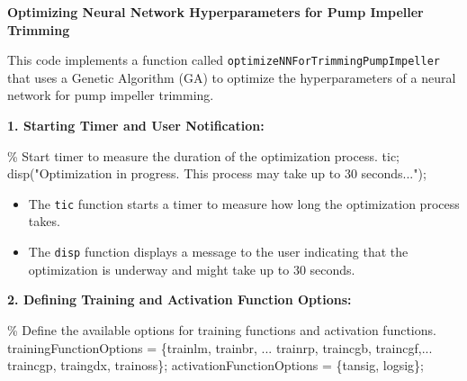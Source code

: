 \documentclass[
  super,
  review,
  3p]{elsarticle}
\newenvironment{Shaded}{\begin{snugshade}}{\end{snugshade}}
\newcommand{\CommentTok}[1]{\textcolor[rgb]{0.37,0.37,0.37}{#1}}
\newcommand{\NormalTok}[1]{\textcolor[rgb]{0.00,0.23,0.31}{#1}}
\newcommand{\OperatorTok}[1]{\textcolor[rgb]{0.37,0.37,0.37}{#1}}
\newcommand{\SpecialStringTok}[1]{\textcolor[rgb]{0.13,0.47,0.30}{#1}}
\newcommand{\StringTok}[1]{\textcolor[rgb]{0.13,0.47,0.30}{#1}}
\newcommand{\VariableTok}[1]{\textcolor[rgb]{0.07,0.07,0.07}{#1}}
\providecommand{\tightlist}{%
  \setlength{\itemsep}{0pt}\setlength{\parskip}{0pt}}\usepackage{longtable,booktabs,array}
\begin{document}
\textbf{Optimizing Neural Network Hyperparameters for Pump Impeller
Trimming}

This code implements a function called
\texttt{optimizeNNForTrimmingPumpImpeller} that uses a Genetic Algorithm
(GA) to optimize the hyperparameters of a neural network for pump
impeller trimming.

\textbf{1. Starting Timer and User Notification:}

\begin{Shaded}
\begin{Highlighting}[]
    \CommentTok{\% Start timer to measure the duration of the optimization process.}
    \VariableTok{tic}\OperatorTok{;}
    \VariableTok{disp}\NormalTok{(}\StringTok{"Optimization in progress. This process may take up to 30 seconds..."}\NormalTok{)}\OperatorTok{;}
\end{Highlighting}
\end{Shaded}

\begin{itemize}
\tightlist
\item
  The \texttt{tic} function starts a timer to measure how long the
  optimization process takes.
\item
  The \texttt{disp} function displays a message to the user indicating
  that the optimization is underway and might take up to 30 seconds.
\end{itemize}

\textbf{2. Defining Training and Activation Function Options:}

\begin{Shaded}
\begin{Highlighting}[]
\CommentTok{\% Define the available options for training functions and activation functions.}
    \VariableTok{trainingFunctionOptions} \OperatorTok{=}\NormalTok{ \{}\SpecialStringTok{\textquotesingle{}trainlm\textquotesingle{}}\OperatorTok{,} \SpecialStringTok{\textquotesingle{}trainbr\textquotesingle{}}\OperatorTok{,} \OperatorTok{...}
    \SpecialStringTok{\textquotesingle{}trainrp\textquotesingle{}}\OperatorTok{,} \SpecialStringTok{\textquotesingle{}traincgb\textquotesingle{}}\OperatorTok{,} \SpecialStringTok{\textquotesingle{}traincgf\textquotesingle{}}\OperatorTok{,...}
     \SpecialStringTok{\textquotesingle{}traincgp\textquotesingle{}}\OperatorTok{,} \SpecialStringTok{\textquotesingle{}traingdx\textquotesingle{}}\OperatorTok{,} \SpecialStringTok{\textquotesingle{}trainoss\textquotesingle{}}\NormalTok{\}}\OperatorTok{;}
    \VariableTok{activationFunctionOptions} \OperatorTok{=}\NormalTok{ \{}\SpecialStringTok{\textquotesingle{}tansig\textquotesingle{}}\OperatorTok{,} \SpecialStringTok{\textquotesingle{}logsig\textquotesingle{}}\NormalTok{\}}\OperatorTok{;}
\end{Highlighting}
\end{Shaded}
\end{document}
